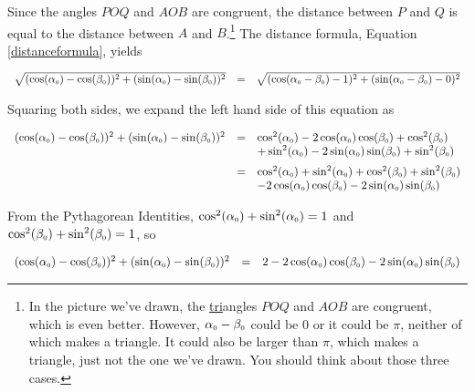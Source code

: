 Since the angles $POQ$ and $AOB$ are congruent, the distance between $P$ and $Q$ is equal to the distance between $A$ and $B$.\footnote{In the picture we've drawn, the \underline{tri}angles $POQ$ and $AOB$ are congruent, which is even better.  However, $\alpha_{\mbox{\tiny $0$}} - \beta_{\mbox{\tiny $0$}}$ could be $0$ or it could be $\pi$, neither of which makes a triangle.  It could also be larger than $\pi$, which makes a triangle, just not the one we've drawn.  You should think about those three cases.}  The distance formula, Equation \ref{distanceformula}, yields

\[ \begin{array}{rcl}

\sqrt{(\cos(\alpha_{\mbox{\tiny $0$}}) - \cos(\beta_{\mbox{\tiny $0$}}))^2 + (\sin(\alpha_{\mbox{\tiny $0$}}) - \sin(\beta_{\mbox{\tiny $0$}}))^2 } & = & \sqrt{(\cos(\alpha_{\mbox{\tiny $0$}} - \beta_{\mbox{\tiny $0$}}) - 1)^2 + (\sin(\alpha_{\mbox{\tiny $0$}} - \beta_{\mbox{\tiny $0$}}) - 0)^2} \\ \end{array} \]

Squaring both sides, we expand the left hand side of this equation as

\[ \begin{array}{rcl}
(\cos(\alpha_{\mbox{\tiny $0$}}) - \cos(\beta_{\mbox{\tiny $0$}}))^2 + (\sin(\alpha_{\mbox{\tiny $0$}}) - \sin(\beta_{\mbox{\tiny $0$}}))^2 
& = &  
\cos^2(\alpha_{\mbox{\tiny $0$}}) - 2\cos(\alpha_{\mbox{\tiny $0$}})\cos(\beta_{\mbox{\tiny $0$}}) + \cos^2(\beta_{\mbox{\tiny $0$}}) \\  
& & + \sin^2(\alpha_{\mbox{\tiny $0$}}) - 2\sin(\alpha_{\mbox{\tiny $0$}})\sin(\beta_{\mbox{\tiny $0$}})  +  \sin^2(\beta_{\mbox{\tiny $0$}}) \\ [6pt]
& = & \cos^2(\alpha_{\mbox{\tiny $0$}}) + \sin^2(\alpha_{\mbox{\tiny $0$}}) + \cos^2(\beta_{\mbox{\tiny $0$}}) + \sin^2(\beta_{\mbox{\tiny $0$}}) \\
& & -  2\cos(\alpha_{\mbox{\tiny $0$}})\cos(\beta_{\mbox{\tiny $0$}}) - 2\sin(\alpha_{\mbox{\tiny $0$}})\sin(\beta_{\mbox{\tiny $0$}}) \end{array}\]

From the Pythagorean Identities, $\cos^2(\alpha_{\mbox{\tiny $0$}}) + \sin^2(\alpha_{\mbox{\tiny $0$}}) = 1$ and $\cos^2(\beta_{\mbox{\tiny $0$}}) + \sin^2(\beta_{\mbox{\tiny $0$}}) = 1$, so

\[ \begin{array}{rcl}
(\cos(\alpha_{\mbox{\tiny $0$}}) - \cos(\beta_{\mbox{\tiny $0$}}))^2 + (\sin(\alpha_{\mbox{\tiny $0$}}) - \sin(\beta_{\mbox{\tiny $0$}}))^2 
& = & 2  - 2\cos(\alpha_{\mbox{\tiny $0$}})\cos(\beta_{\mbox{\tiny $0$}}) - 2\sin(\alpha_{\mbox{\tiny $0$}})\sin(\beta_{\mbox{\tiny $0$}}) \end{array}\]


